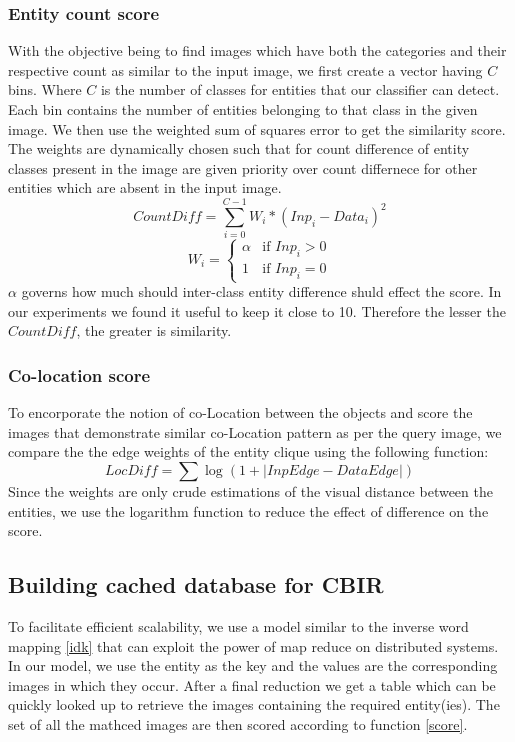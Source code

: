 \documentclass[conference]{IEEEtran}
\begin{document}
        \subsubsection{Entity count score}
        With the objective being to find images which have both the categories and their respective count  as similar to the input image, we first create a vector having $C$ bins. Where $C$ is the number of classes for entities that our classifier can detect. Each bin contains the number of entities belonging to that class in the given image. We then use the weighted sum of squares error to get the similarity score. The weights are dynamically chosen such that for count difference of entity classes present in the image are given priority over count differnece for other entities which are absent in the input image.\\
            \begin{equation}
            CountDiff =  \sum_{i=0}^{C-1} W_{i}*(Inp_{i} - Data_{i})^{2}
            \end{equation}
            \[
              W_{i} = 
              \begin{cases} 
               \alpha & \text{if } Inp_{i} > 0 \\
               1       & \text{if } Inp_{i} = 0
              \end{cases}
            \]
            $\alpha $ governs how much should inter-class entity difference shuld effect the score. In our experiments we found it useful to keep it close to 10. Therefore the lesser the $CountDiff$, the greater is similarity.
        
    \subsubsection{Co-location score}
    To encorporate the notion of co-Location between the objects and score the images that demonstrate similar co-Location pattern as per the query image, we compare the the edge weights of the entity clique using the following function:
        \begin{equation}
        LocDiff = \sum \log (1 + |InpEdge - DataEdge|)
        \end{equation}
    Since the weights are only crude estimations of the visual distance between the entities, we use the logarithm function to reduce the effect of difference on the score.
    
    \subsection{Building cached database for CBIR}
    To facilitate efficient scalability, we use a model similar to the inverse word mapping \ref{idk} that can exploit the power of map reduce on distributed systems. In our model, we use the entity as the key and the values are the corresponding images in which they occur. After a final reduction we get a table which can be quickly looked up to retrieve the images containing the required entity(ies). The set of all the mathced images are then scored according to function \ref{score}. 
\end{document}
